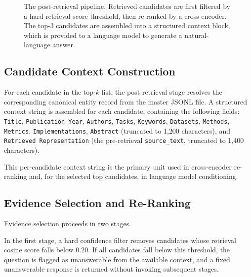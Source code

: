 \begin{figure}[htbp]
  \centering
  \caption{The post-retrieval pipeline. Retrieved candidates are first
    filtered by a hard retrieval-score threshold, then re-ranked by a
    cross-encoder. The top-3 candidates are assembled into a structured
    context block, which is provided to a language model to generate a
    natural-language answer.}
  \label{fig:postretrieval_pipeline}
\end{figure}

\subsection{Candidate Context Construction}
\label{subsec:context_construction}

For each candidate in the top-$k$ list, the post-retrieval stage resolves
the corresponding canonical entity record from the master JSONL file.
A structured context string is assembled for each candidate, containing the
following fields: \texttt{Title}, \texttt{Publication Year}, \texttt{Authors},
\texttt{Tasks}, \texttt{Keywords}, \texttt{Datasets}, \texttt{Methods},
\texttt{Metrics}, \texttt{Implementations}, \texttt{Abstract} (truncated to
1{,}200 characters), and \texttt{Retrieved Representation} (the pre-retrieval
\texttt{source\_text}, truncated to 1{,}400 characters).

This per-candidate context string is the primary unit used in cross-encoder
re-ranking and, for the selected top candidates, in language model
conditioning.

\subsection{Evidence Selection and Re-Ranking}
\label{subsec:reranking}

Evidence selection proceeds in two stages.

In the first stage, a hard confidence filter removes candidates whose
retrieval cosine score falls below 0.20.
If all candidates fall below this threshold, the question is flagged as
unanswerable from the available context, and a fixed unanswerable response
is returned without invoking subsequent stages.

